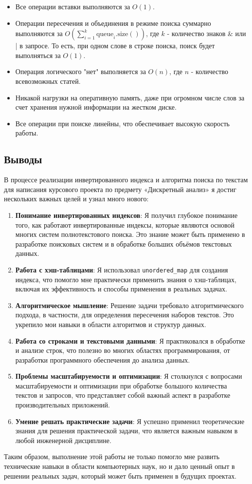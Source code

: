 \documentclass[12pt]{article}
\begin{document}
\begin{itemize}
    \item Все операции вставки выполняются за \( O(1) \).
    \item Операции пересечения и объединения в режиме поиска суммарно выполняются за \( O\left(\sum_{i=1}^{k} \text{queue}_i.\text{size}()\right) \), где \( k \) - количество знаков & или | в запросе. То есть, при одном слове в строке поиска, поиск будет выполняться за \( O(1) \).
    \item Операция логического "нет" выполняется за \( O(n) \), где \( n \) - количество всевозможных статей.
    \item Никакой нагрузки на оперативную память, даже при огромном числе слов за счет хранения нужной информации на жестком диске.
    \item Все операции при поиске линейны, что обеспечивает высокую скорость работы.
\end{itemize}

\subsection*{Выводы}

В процессе реализации инвертированного индекса и алгоритма поиска по текстам для написания курсового проекта по предмету «Дискретный анализ» я достиг нескольких важных целей и узнал много нового:

\begin{enumerate}
    \item \textbf{Понимание инвертированных индексов}: Я получил глубокое понимание того, как работают инвертированные индексы, которые являются основой многих систем полнотекстового поиска. Это знание может быть применено в разработке поисковых систем и в обработке больших объёмов текстовых данных.
    \item \textbf{Работа с хэш-таблицами}: Я использовал \texttt{unordered\_map} для создания индекса, что помогло мне практически применить знания о хэш-таблицах, включая их эффективность и способы применения в реальных задачах.
    \item \textbf{Алгоритмическое мышление}: Решение задачи требовало алгоритмического подхода, в частности, для определения пересечения наборов текстов. Это укрепило мои навыки в области алгоритмов и структур данных.
    \item \textbf{Работа со строками и текстовыми данными}: Я практиковался в обработке и анализе строк, что полезно во многих областях программирования, от разработки программного обеспечения до анализа данных.
    \item \textbf{Проблемы масштабируемости и оптимизации}: Я столкнулся с вопросами масштабируемости и оптимизации при обработке большого количества текстов и запросов, что представляет собой важный аспект в разработке производительных приложений.
    \item \textbf{Умение решать практические задачи}: Я успешно применил теоретические знания для решения практической задачи, что является важным навыком в любой инженерной дисциплине.
\end{enumerate}

Таким образом, выполнение этой работы не только помогло мне развить технические навыки в области компьютерных наук, но и дало ценный опыт в решении реальных задач, который может быть применен в будущих проектах.
\end{document}
